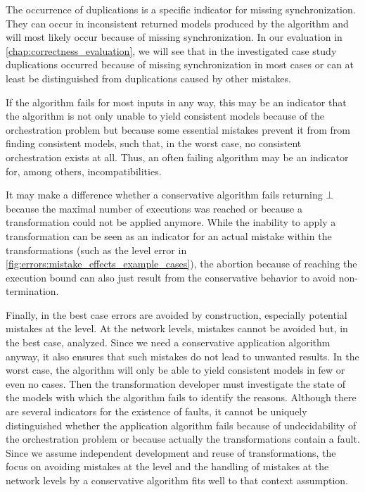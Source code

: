 The occurrence of duplications is a specific indicator for missing synchronization.
They can occur in inconsistent returned models produced by the algorithm and will most likely occur because of missing synchronization.
In our evaluation in \autoref{chap:correctness_evaluation}, we will see that in the investigated case study duplications occurred because of missing synchronization in most cases or can at least be distinguished from duplications caused by other mistakes.

If the algorithm fails for most inputs in any way, this may be an indicator that the algorithm is not only unable to yield consistent models because of the orchestration problem but because some essential mistakes prevent it from from finding consistent models, such that, in the worst case, no consistent orchestration exists at all.
Thus, an often failing algorithm may be an indicator for, among others, incompatibilities.

It may make a difference whether a conservative algorithm fails returning $\bot$ because the maximal number of executions was reached or because a transformation could not be applied anymore.
While the inability to apply a transformation can be seen as an indicator for an actual mistake within the transformations (such as the \levelnetworkrelation level error in \autoref{fig:errors:mistake_effects_example_cases}), the abortion because of reaching the execution bound can also just result from the conservative behavior to avoid non-termination.

Finally, in the best case errors are avoided by construction, especially potential mistakes at the \leveltransformation level.
At the network levels, mistakes cannot be avoided but, in the best case, analyzed.
Since we need a conservative application algorithm anyway, it also ensures that such mistakes do not lead to unwanted results.
In the worst case, the algorithm will only be able to yield consistent models in few or even no cases.
Then the transformation developer must investigate the state of the models with which the algorithm fails to identify the reasons.
Although there are several indicators for the existence of faults, it cannot be uniquely distinguished whether the application algorithm fails because of undecidability of the orchestration problem or because actually the transformations contain a fault.
Since we assume independent development and reuse of transformations, the focus on avoiding mistakes at the \leveltransformation level and the handling of mistakes at the network levels by a conservative algorithm fits well to that context assumption.

